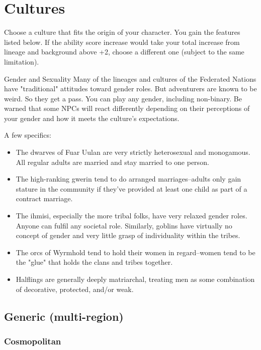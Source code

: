 \section{Cultures}\label{sec:cultures}
Choose a culture that fits the origin of your character.  You gain the features listed below. If the ability score increase would take your total increase from lineage and background above +2, choose a different one (subject to the same limitation).

\begin{DndComment}{Gender and Sexuality}
	Many of the lineages and cultures of the Federated Nations have "traditional" attitudes toward gender roles. But adventurers are known to be weird. So they get a pass. You can play any gender, including non-binary. Be warned that some NPCs will react differently depending on their perceptions of your gender and how it meets the culture's expectations.

	A few specifics:
	\begin{itemize}
		\item The dwarves of Fuar Uulan are very strictly heterosexual and monogamous. All regular adults are married and stay married to one person.
		\item The high-ranking gwerin tend to do arranged marriages--adults only gain stature in the community if they've provided at least one child as part of a contract marriage.
		\item The ihmisi, especially the more tribal folks, have very relaxed gender roles. Anyone can fulfil any societal role. Similarly, goblins have virtually no concept of gender and very little grasp of individuality within the tribes.
		\item The orcs of Wyrmhold tend to hold their women in regard--women tend to be the "glue" that holds the clans and tribes together.
		\item Halflings are generally deeply matriarchal, treating men as some combination of decorative, protected, and/or weak.
	\end{itemize} 
\end{DndComment}

\subsection{Generic (multi-region)}
\subsubsection{Cosmopolitan}


